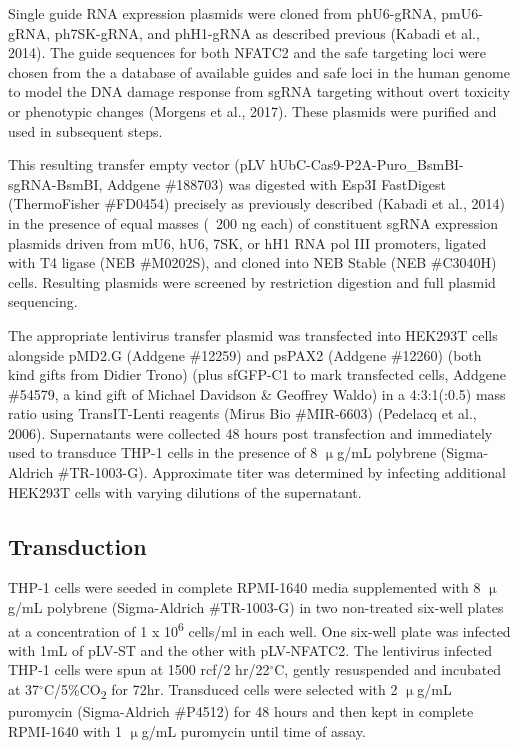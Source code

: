 Single guide RNA expression plasmids were cloned from phU6-gRNA, pmU6-gRNA, ph7SK-gRNA, and phH1-gRNA as described previous (Kabadi et al., 2014). The guide sequences for both NFATC2 and the safe targeting loci were chosen from the a database of available guides and safe loci in the human genome to model the DNA damage response from sgRNA targeting without overt toxicity or phenotypic changes (Morgens et al., 2017). These plasmids were purified and used in subsequent steps.

This resulting transfer empty vector (pLV hUbC-Cas9-P2A-Puro\_BsmBI-sgRNA-BsmBI, Addgene \#188703) was digested with Esp3I FastDigest (ThermoFisher \#FD0454) precisely as previously described (Kabadi et al., 2014) in the presence of equal masses (~200 ng each) of constituent sgRNA expression plasmids driven from mU6, hU6, 7SK, or hH1 RNA pol III promoters, ligated with T4 ligase (NEB \#M0202S), and cloned into NEB Stable (NEB \#C3040H) cells. Resulting plasmids were screened by restriction digestion and full plasmid sequencing. 

The appropriate lentivirus transfer plasmid was transfected into HEK293T cells alongside pMD2.G (Addgene \#12259) and psPAX2 (Addgene \#12260) (both kind gifts from Didier Trono) (plus sfGFP-C1 to mark transfected cells, Addgene \#54579, a kind gift of Michael Davidson \& Geoffrey Waldo) in a 4:3:1(:0.5) mass ratio using TransIT-Lenti reagents (Mirus Bio \#MIR-6603) (Pedelacq et al., 2006). Supernatants were collected 48 hours post transfection and immediately used to transduce THP-1 cells in the presence of 8 $\upmu$g/mL polybrene (Sigma-Aldrich \#TR-1003-G). Approximate titer was determined by infecting additional HEK293T cells with varying dilutions of the supernatant.

\subsection{Transduction}

THP-1 cells were seeded in complete RPMI-1640 media supplemented with 8 $\upmu$g/mL polybrene (Sigma-Aldrich \#TR-1003-G) in two non-treated six-well plates at a concentration of 1 x 10\textsuperscript{6} cells/ml in each well. One six-well plate was infected with 1mL of pLV-ST and the other with pLV-NFATC2. The lentivirus infected THP-1 cells were spun at 1500 rcf/2 hr/22$^{\circ}$C, gently resuspended and incubated at 37$^{\circ}$C/5\%CO\textsubscript{2} for 72hr. Transduced cells were selected with 2 $\upmu$g/mL puromycin (Sigma-Aldrich \#P4512) for 48 hours and then kept in complete RPMI-1640 with 1 $\upmu$g/mL puromycin until time of assay.

